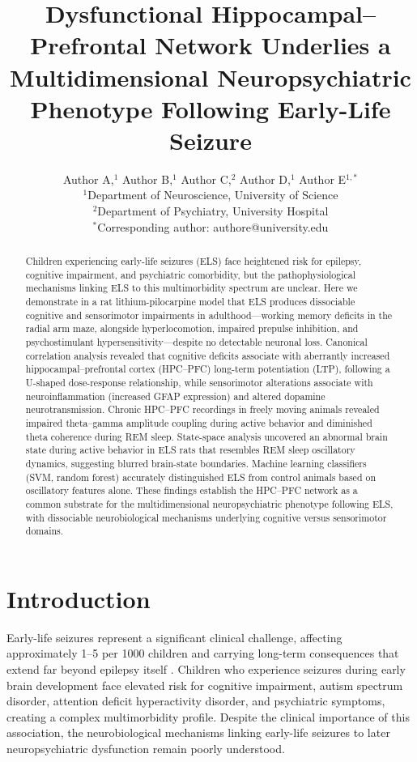 \documentclass[11pt]{article}
\title{Dysfunctional Hippocampal--Prefrontal Network Underlies a Multidimensional Neuropsychiatric Phenotype Following Early-Life Seizure}
\author{Author A,$^{1}$ Author B,$^{1}$ Author C,$^{2}$ Author D,$^{1}$ Author E$^{1,*}$\\
\small $^{1}$Department of Neuroscience, University of Science\\
\small $^{2}$Department of Psychiatry, University Hospital\\
\small $^{*}$Corresponding author: authore@university.edu}
\date{}
\begin{document}
\maketitle

\begin{abstract}
Children experiencing early-life seizures (ELS) face heightened risk for epilepsy, cognitive impairment, and psychiatric comorbidity, but the pathophysiological mechanisms linking ELS to this multimorbidity spectrum are unclear. Here we demonstrate in a rat lithium-pilocarpine model that ELS produces dissociable cognitive and sensorimotor impairments in adulthood---working memory deficits in the radial arm maze, alongside hyperlocomotion, impaired prepulse inhibition, and psychostimulant hypersensitivity---despite no detectable neuronal loss. Canonical correlation analysis revealed that cognitive deficits associate with aberrantly increased hippocampal--prefrontal cortex (HPC--PFC) long-term potentiation (LTP), following a U-shaped dose-response relationship, while sensorimotor alterations associate with neuroinflammation (increased GFAP expression) and altered dopamine neurotransmission. Chronic HPC--PFC recordings in freely moving animals revealed impaired theta--gamma amplitude coupling during active behavior and diminished theta coherence during REM sleep. State-space analysis uncovered an abnormal brain state during active behavior in ELS rats that resembles REM sleep oscillatory dynamics, suggesting blurred brain-state boundaries. Machine learning classifiers (SVM, random forest) accurately distinguished ELS from control animals based on oscillatory features alone. These findings establish the HPC--PFC network as a common substrate for the multidimensional neuropsychiatric phenotype following ELS, with dissociable neurobiological mechanisms underlying cognitive versus sensorimotor domains.
\end{abstract}

\section{Introduction}

Early-life seizures represent a significant clinical challenge, affecting approximately 1--5 per 1000 children and carrying long-term consequences that extend far beyond epilepsy itself \citep{holmes2015consequences}. Children who experience seizures during early brain development face elevated risk for cognitive impairment, autism spectrum disorder, attention deficit hyperactivity disorder, and psychiatric symptoms, creating a complex multimorbidity profile. Despite the clinical importance of this association, the neurobiological mechanisms linking early-life seizures to later neuropsychiatric dysfunction remain poorly understood.
\end{document}
